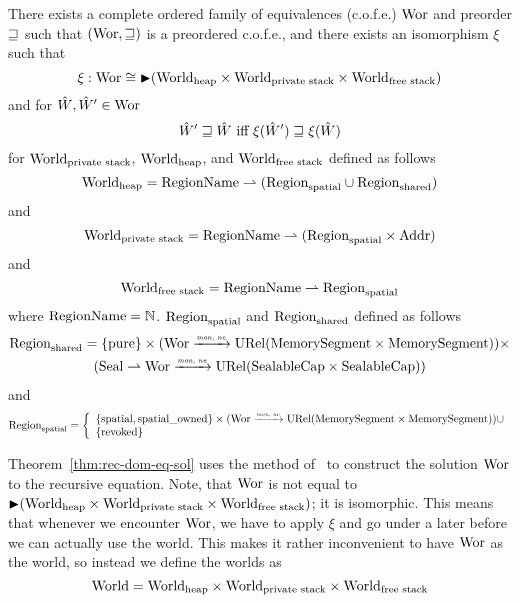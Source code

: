 \begin{theorem}
  \label{thm:rec-dom-eq-sol}
  There exists a complete ordered family of equivalences (c.o.f.e.) $\Wor$ and preorder $\future$ such that $(\Wor,\future)$ is a preordered c.o.f.e., and there exists an isomorphism $\xi$ such that
  \[
    \xi : \Wor \cong \blater (\Worldh \times \Worlds \times \Worldfs)
  \]
  and for $\hat{W},\hat{W}' \in \Wor$
  \[
    \hat{W}' \future \hat{W} \text{ iff } \xi(\hat{W}') \future \xi(\hat{W})
  \]
  for $\Worlds$, $\Worldh$, and $\Worldfs$ defined as follows
\[
  \Worldh = \RegionName \parfun (\Regions \cup \Regionh)
\]
and
\[
  \Worlds = \RegionName \parfun (\Regions \times \Addr)
\]
and
\[
  \Worldfs = \RegionName \parfun \Regions
\]
where $\RegionName = \nats$. $\Regions$ and $\Regionh$ defined as follows
\begin{multline*}
  \Regionh = 
  \{\pure \} \times (\Wor \monnefun \URel{\MemSeg\times\MemSeg}) \times \\
  (\Seal \parfun \Wor \monnefun \URel{\SealableCaps\times\SealableCaps})
\end{multline*}
and
\[
  \Regions = \left\{
  \begin{array}{l}
    \{\spatial, \spatialo\} \times (\Wor \monnefun \URel{\MemSeg\times\MemSeg}) \cup\\
    \{\revoked\}
  \end{array} \right.
\]
\end{theorem}
Theorem~\ref{thm:rec-dom-eq-sol} uses the method of~\citet{Birkedal:2011:SKM:1926385.1926401,birkedal_taste_2014} to construct the solution $\Wor$ to the recursive equation.
Note, that $\Wor$ is not equal to $\blater (\Worldh \times \Worlds \times \Worldfs)$; it is isomorphic.
This means that whenever we encounter $\Wor$, we have to apply $\xi$ and go under a later before we can actually use the world.
This makes it rather inconvenient to have $\Wor$ as the world, so instead we define the worlds as 
\[
  \World = \Worldh \times \Worlds \times \Worldfs
\]

